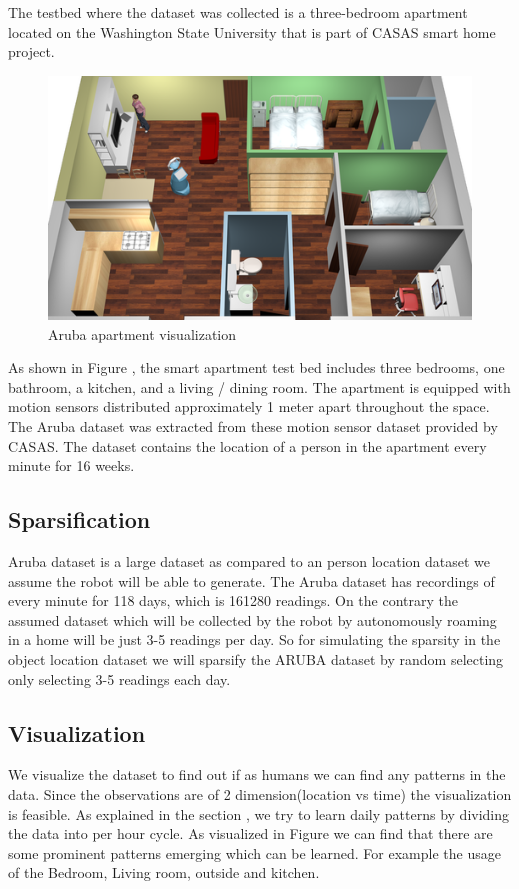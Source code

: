 \documentclass[11pt]{book}
\begin{document}
The testbed where the dataset was collected is a  three-bedroom apartment located on the Washington State University that is part of CASAS smart home project. 
\begin{figure}[htp]
\centering
\includegraphics[width=\textwidth]{images/aruba-flat.png}
\caption{Aruba apartment visualization}
\label{aruba}
\end{figure}
As shown in Figure \cite{aruba}, the smart apartment test bed includes three bedrooms, one bathroom, a kitchen, and a living / dining room.  The apartment is equipped with motion sensors distributed approximately 1 meter apart throughout the space. The Aruba dataset was extracted from these motion sensor dataset provided by CASAS. The dataset contains the location of a person in the apartment every minute for 16 weeks.

\subsection*{Sparsification}
Aruba dataset is a large dataset as compared to an person location dataset we assume the robot will be able to generate. The Aruba dataset has recordings of every minute for 118 days, which is 161280 readings.
On the contrary the assumed dataset which will be collected by the robot by autonomously roaming in a home will be just 3-5 readings per day.
So for simulating the sparsity in the object location dataset we will sparsify the ARUBA dataset by random selecting only selecting 3-5 readings each day.

\subsection*{Visualization}
We visualize the dataset to find out if as humans we can find any patterns in the data. Since the observations are of 2 dimension(location vs time) the visualization is feasible. As explained in the section , we try to learn daily patterns by dividing the data into per hour cycle. As visualized in Figure \cite{aruba-visual} we can find that there are some prominent patterns emerging which can be learned. For example the usage of the Bedroom, Living room, outside and kitchen.
\end{document}
